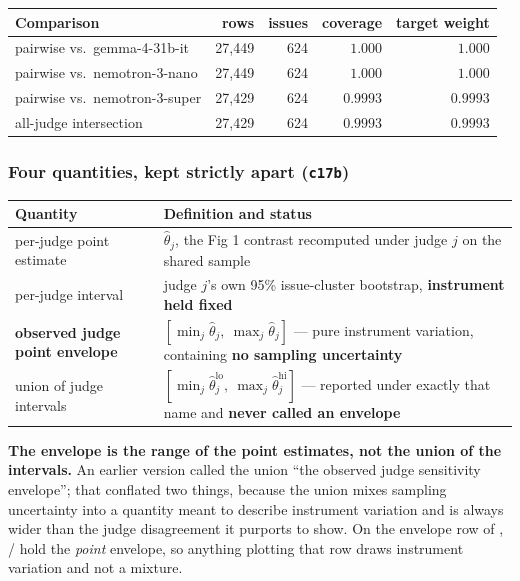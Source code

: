 \documentclass[11pt]{article}
\DeclareRobustCommand{\code}[1]{\texttt{\seqsplit{#1}}}
\DeclareRobustCommand{\hfile}[1]{\texttt{#1}}
\begin{document}
\begin{center}
\small
\begin{tabular}{@{}lrrrr@{}}
\toprule
\textbf{Comparison} & \textbf{rows} & \textbf{issues} & \textbf{coverage} & \textbf{target weight} \\
\midrule
pairwise vs.\ gemma-4-31b-it        & 27{,}449 & 624 & $1.000$ & $1.000$ \\
pairwise vs.\ nemotron-3-nano       & 27{,}449 & 624 & $1.000$ & $1.000$ \\
pairwise vs.\ nemotron-3-super      & 27{,}429 & 624 & $0.9993$ & $0.9993$ \\
all-judge intersection              & 27{,}429 & 624 & $0.9993$ & $0.9993$ \\
\bottomrule
\end{tabular}
\end{center}

\subsubsection{Four quantities, kept strictly apart (\hfile{c17b})}

\begin{center}
\small
\begin{tabular}{@{}p{4.1cm}p{9.5cm}@{}}
\toprule
\textbf{Quantity} & \textbf{Definition and status} \\
\midrule
per-judge point estimate & $\hat\theta_j$, the Fig 1 contrast recomputed under
  judge $j$ on the shared sample \\
per-judge interval & judge $j$'s own 95\% issue-cluster bootstrap,
  \textbf{instrument held fixed} \\
\textbf{observed judge point envelope} & $[\min_j \hat\theta_j,\
  \max_j \hat\theta_j]$ --- pure instrument variation, containing
  \textbf{no sampling uncertainty} \\
union of judge intervals & $[\min_j \hat\theta_j^{\text{lo}},\
  \max_j \hat\theta_j^{\text{hi}}]$ --- reported under exactly that name and
  \textbf{never called an envelope} \\
\bottomrule
\end{tabular}
\end{center}

\noindent \textbf{The envelope is the range of the point estimates, not the
union of the intervals.} An earlier version called the union ``the observed
judge sensitivity envelope''; that conflated two things, because the union mixes
sampling uncertainty into a quantity meant to describe instrument variation and
is always wider than the judge disagreement it purports to show. On the envelope
row of \code{c17b}, \code{conf\_low}/\code{conf\_high} hold the \emph{point}
envelope, so anything plotting that row draws instrument variation and not a
mixture.
\end{document}
